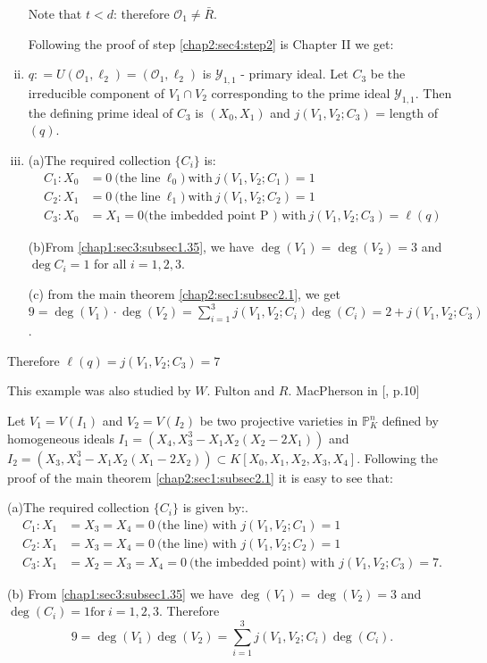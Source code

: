 \begin{example}
\begin{enumerate}[(i)]
    Note that $t < d$: therefore $\mathscr{O} _1 \neq \bar{R}$.
    
    Following the proof of step \ref{chap2:sec4:step2} is Chapter II we get: 
  \item $q:  = U (\mathscr{O}_1, \ell_2) = (\mathscr{O}_1, \ell_2)$ is
    $\mathscr{Y}_{1,1}$ - primary ideal. Let $C_3$ be the irreducible
    component of $V_1 \cap V_2$ corresponding to the prime ideal
    $\mathscr{Y}_{1,1}$. Then the defining prime ideal of $C_3$ is $(X_0,
    X_1) $ and $ j(V_1,V_2 ;C_3)$ = length of $(q)$.
    
  \item (a)\pageoriginale The required collection $\{C_i\}$ is: 
    \begin{align*}
      C_1 : X_0 & = 0 ~\text{(the line} ~\ell_0) ~\text{with} ~j(V_1,
      V_2 ; C_1) = 1\\ 
      C_2 : X_1 &= 0 ~\text{(the line} ~\ell_1) ~\text{with} ~j(V_1,
      V_2 ; C_2) = 1\\ 
      C_3 : X_0 &=X_1 = 0 \text{(the imbedded point P ) with} ~j(V_1,
      V_2 ; C_3) =\ell (q) 
    \end{align*}
    
    (b)\pageoriginale From \ref{chap1:sec3:subsec1.35}, we have $\deg
    (V_1) = \deg (V_2) = 3$ and $\deg C_i = 1$ for all $i =1,2,3$. 
    
    (c) from the main theorem \ref{chap2:sec1:subsec2.1}, we get $9 = \deg (V_1) \cdot \deg (V_2) =
  \sum \limits_{i = 1}^3 j (V_1,V_2;C_i) \deg (C_i) = 2+ j
  (V_1,V_2;C_3)$.  
  \end{enumerate}
\end{example}

Therefore $\ell(q) = j (V_1,V_2;C_3) = 7$ 

This example was also studied by $W$. Fulton and $R$. MacPherson in
[\cite{19}, p.10] 

\setcounter{example}{7}
\begin{example}\label{chap3:sec1:exp3.8}
  Let $V_1 = V(I_1)$ and $V_2 = V(I_2) $ be two projective varieties
  in $\mathbb{P}^n_K$ defined by homogeneous ideals $I_1 = (X_4,
  X^3_3-X_1X_2(X_2-2X_1))$ and $I_2 = (X_3, X^3_4-X_1X_2(X_1-2X_2))
  \subset K[X_0,X_1,X_2,X_3,X_4]$. Following the proof of the main
  theorem \ref{chap2:sec1:subsec2.1} it is easy to see that:   
  
  (a)The required collection $\{ C_i\}$ is given by:.
{\fontsize{10pt}{12pt}\selectfont
  \begin{align*}
    C_1:X_1&=X_3=X_4 = 0 ~\text{(the line) with } j(V_1, V_2 ;C_1) = 1\\
    C_2:X_1&=X_3=X_4 = 0 ~\text{(the line) with } j(V_1, V_2 ;C_2) = 1\\
    C_3:X_1&=X_2=X_3=X_4 = 0 ~\text{(the imbedded point) with }
    j(V_1, V_2 ;C_3) = 7. 
  \end{align*}}\relax

  (b) From \ref{chap1:sec3:subsec1.35} we have $\deg (V_1) = \deg
  (V_2) = 3$ and $\deg (C_i) = 1 \text{for}~ i = 1,2,3$. Therefore 
  $$
  9 = \deg (V_1) \deg (V_2) = \sum_{i=1}^3 j(V_1,V_2 ;C_i) \deg (C_i).
  $$
\end{example}

